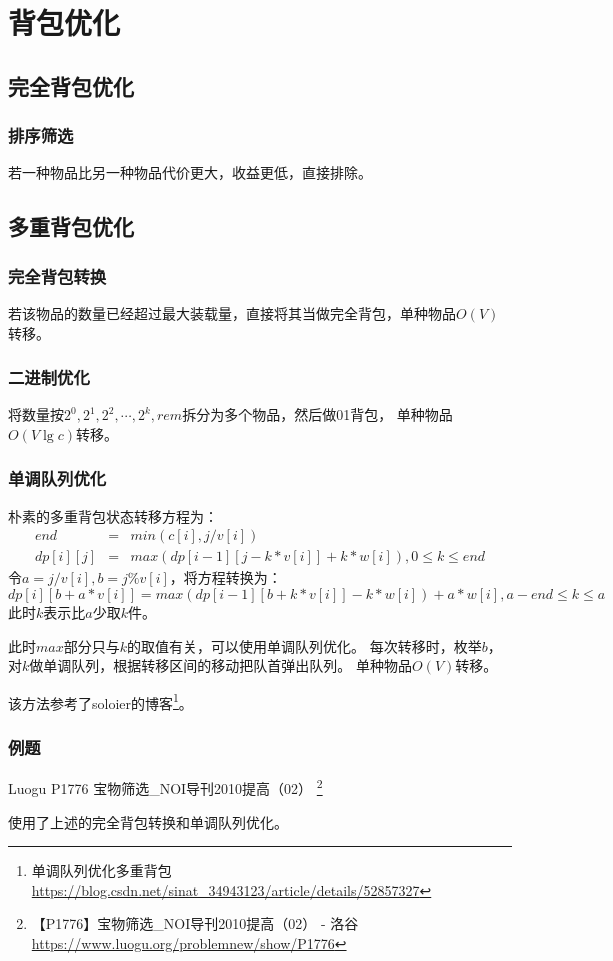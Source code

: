\section{背包优化}
\subsection{完全背包优化}
\subsubsection{排序筛选}
若一种物品比另一种物品代价更大，收益更低，直接排除。
\subsection{多重背包优化}
\subsubsection{完全背包转换}
若该物品的数量已经超过最大装载量，直接将其当做完全背包，单种物品$O(V)$转移。
\subsubsection{二进制优化}
将数量按$2^0,2^1,2^2,\cdots,2^k,rem$拆分为多个物品，然后做01背包，
单种物品$O(V\lg c)$转移。
\subsubsection{单调队列优化}
朴素的多重背包状态转移方程为：
\begin{eqnarray*}
    end&=&min(c[i],j/v[i])\\
    dp[i][j]&=&max(dp[i-1][j-k*v[i]]+k*w[i]),0\leq k \leq end
\end{eqnarray*}
令$a=j/v[i],b=j\%v[i]$，将方程转换为：
\begin{displaymath}
    dp[i][b+a*v[i]]=max(dp[i-1][b+k*v[i]]-k*w[i])+a*w[i],a-end\leq k \leq a
\end{displaymath}
此时$k$表示比$a$少取$k$件。

此时$max$部分只与$k$的取值有关，可以使用单调队列优化。
每次转移时，枚举$b$，对$k$做单调队列，根据转移区间的移动把队首弹出队列。
单种物品$O(V)$转移。

该方法参考了soloier的博客\footnote{单调队列优化多重背包\\
\url{https://blog.csdn.net/sinat\_34943123/article/details/52857327}}。

\subsubsection{例题}
Luogu P1776 宝物筛选\_NOI导刊2010提高（02）
\footnote{【P1776】宝物筛选\_NOI导刊2010提高（02） - 洛谷
\url{https://www.luogu.org/problemnew/show/P1776}}

使用了上述的完全背包转换和单调队列优化。


